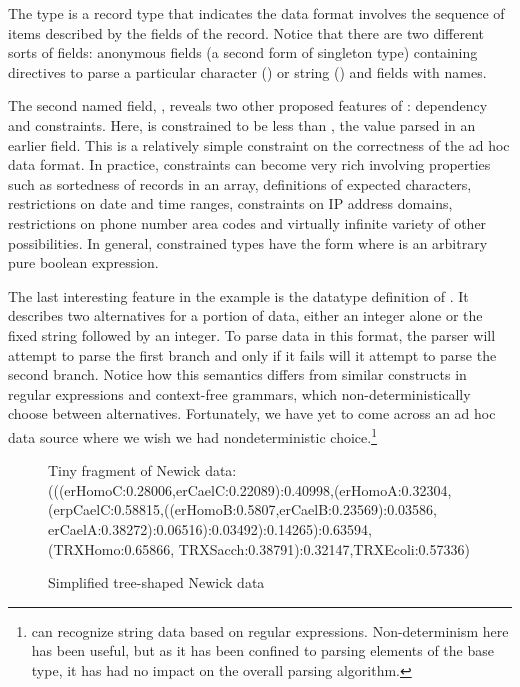 The type  is a record type that indicates the data
format involves the sequence of items described by the fields of the
record.  Notice that there are two different sorts of fields:
anonymous fields (a second form of singleton type) containing
directives to parse a particular character () or string
() and fields with names.

The second named field, , reveals two other
proposed features of \padsml: dependency and constraints.  Here,
 is constrained to be less than ,
the value parsed in an earlier field.  This is a relatively simple
constraint on the correctness of the ad hoc data format.  In practice,
constraints can become very rich involving properties such as
sortedness of records in an array, definitions of expected characters,
restrictions on date and time ranges, constraints on IP address
domains, restrictions on phone number area codes and virtually
infinite variety of other possibilities. In general, constrained
types have the form \cd{[x:T | e]} where  is an arbitrary pure
boolean expression.  

The last interesting feature in the \dibbler{} example is the datatype
definition of .  It describes two alternatives for a
portion of data, either an integer alone or the fixed string
 followed by an integer.  To parse data in this format,
the parser will attempt to parse the first branch and only if it fails
will it attempt to parse the second branch.  Notice how this semantics
differs from similar constructs in regular expressions and
context-free grammars, which non-deterministically choose between
alternatives.  Fortunately, we have yet to come across an ad hoc data
source where we wish we had nondeterministic choice.\footnote{\pads{}
  can recognize string data based on regular expressions.
  Non-determinism here has been useful, but as it has been confined to
  parsing elements of the  base type, it has had no impact
  on the overall parsing algorithm.}

\begin{figure}
  \begin{code}

\mbox{}
{\rm Tiny fragment of Newick data:} 
\mbox{}
(((erHomoC:0.28006,erCaelC:0.22089):0.40998,(erHomoA:0.32304,
(erpCaelC:0.58815,((erHomoB:0.5807,erCaelB:0.23569):0.03586,
erCaelA:0.38272):0.06516):0.03492):0.14265):0.63594,(TRXHomo:0.65866,
TRXSacch:0.38791):0.32147,TRXEcoli:0.57336)
  \end{code}
  \caption{Simplified tree-shaped Newick data}
  \label{fig:newick}
\end{figure}

